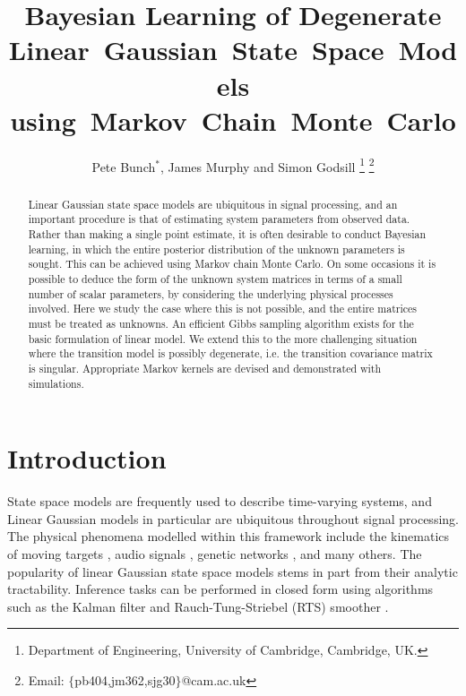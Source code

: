 \documentclass[journal,10pt]{IEEEtran}
\title{Bayesian Learning of Degenerate Linear~Gaussian~State~Space~Models using~Markov~Chain~Monte~Carlo}
\author{Pete Bunch$^*$, James Murphy and Simon Godsill
  \thanks{Department of Engineering, University of Cambridge, Cambridge, UK.}
  \thanks{Email: $\{$pb404,jm362,sjg30$\}$@cam.ac.uk}%
}
\begin{document}
\maketitle



\begin{abstract}
Linear Gaussian state space models are ubiquitous in signal processing, and an important procedure is that of estimating system parameters from observed data. Rather than making a single point estimate, it is often desirable to conduct Bayesian learning, in which the entire posterior distribution of the unknown parameters is sought. This can be achieved using Markov chain Monte Carlo. On some occasions it is possible to deduce the form of the unknown system matrices in terms of a small number of scalar parameters, by considering the underlying physical processes involved. Here we study the case where this is not possible, and the entire matrices must be treated as unknowns. An efficient Gibbs sampling algorithm exists for the basic formulation of linear model. We extend this to the more challenging situation where the transition model is possibly degenerate, i.e. the transition covariance matrix is singular. Appropriate Markov kernels are devised and demonstrated with simulations.
\end{abstract}



\section{Introduction}

State space models are frequently used to describe time-varying systems, and Linear Gaussian models in particular are ubiquitous throughout signal processing. The physical phenomena modelled within this framework include the kinematics of moving targets \cite{Bar-Shalom2002}, audio signals \cite{Godsill1998}, genetic networks \cite{Beal2005}, and many others. The popularity of linear Gaussian state space models stems in part from their analytic tractability. Inference tasks can be performed in closed form using algorithms such as the Kalman filter \cite{Kalman1960} and Rauch-Tung-Striebel (RTS) smoother \cite{Rauch1965}.
\end{document}
